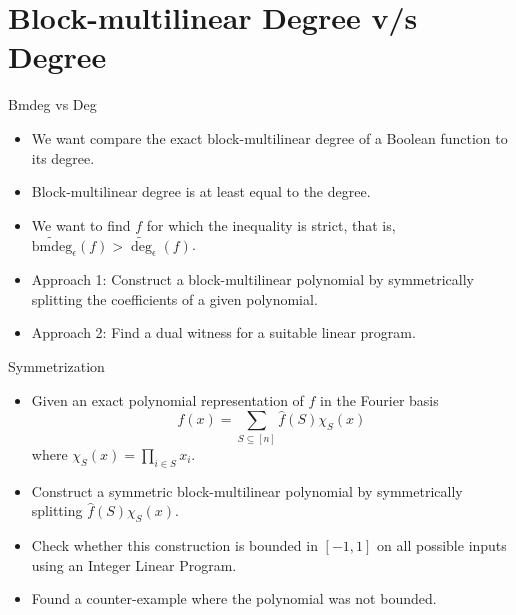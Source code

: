 \documentclass[10pt]{beamer}
\newcommand{\bmdeg}{\mathrm{bmdeg}}
\begin{document}
\section{Block-multilinear Degree v/s Degree}
\begin{frame}{Bmdeg vs Deg}
\begin{itemize}
    \item We want compare the exact block-multilinear degree of a Boolean function to its degree.
    \item Block-multilinear degree is at least equal to the degree.
    \item We want to find $f$ for which the inequality is strict, that is, $\widetilde{\bmdeg}_\epsilon(f) > \widetilde{\deg}_\epsilon(f)$.
    \item Approach 1: Construct a block-multilinear polynomial by symmetrically splitting the coefficients of a given polynomial.
    \item Approach 2: Find a dual witness for a suitable linear program.
\end{itemize}
\end{frame}

\begin{frame}{Symmetrization}
\begin{itemize}
    \item Given an exact polynomial representation of $f$ in the Fourier basis
    \begin{equation*}
    f(x) = \sum_{S\subseteq [n]} \hat{f}(S) \chi_S(x)
    \end{equation*}
    where $\chi_S(x) = \prod_{i\in S}x_i$.
    \item Construct a symmetric block-multilinear polynomial by symmetrically splitting $\hat{f}(S) \chi_S(x)$.
    \item Check whether this construction is bounded in $[-1,1]$ on all possible inputs using an Integer Linear Program.
    \item Found a counter-example where the polynomial was not bounded.
\end{itemize}
\end{frame}
\end{document}
